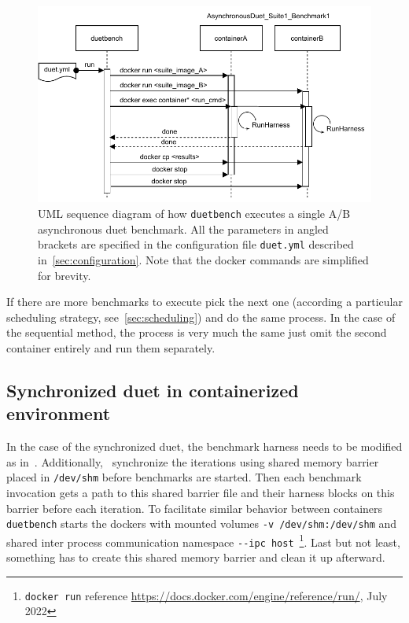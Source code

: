\begin{figure}
	\centering
	\includegraphics[width=\linewidth]{./figures/duetbench-sequence.drawio.pdf}
	\caption{
        UML sequence diagram of how \lstinline{duetbench} executes a single A/B asynchronous duet benchmark.
        All the parameters in angled brackets are specified in the configuration file \lstinline{duet.yml} described in~\cref{sec:configuration}.
        Note that the docker commands are simplified for brevity.
	}
	\label{fig:duetbench_sequence}
\end{figure}

If there are more benchmarks to execute pick the next one (according a particular scheduling strategy, see~\cref{sec:scheduling}) and do the same process.
In the case of the sequential method, the process is very much the same just omit the second container entirely and run them separately.

\subsection{Synchronized duet in containerized environment}

In the case of the synchronized duet, the benchmark harness needs to be modified as in~\citet{bulej2020duet}.
Additionally,~\citet{bulej2020duet} synchronize the iterations using shared memory barrier placed in \lstinline{/dev/shm} before benchmarks are started.
Then each benchmark invocation gets a path to this shared barrier file and their harness blocks on this barrier before each iteration.
To facilitate similar behavior between containers \lstinline{duetbench} starts the dockers with mounted volumes \lstinline{-v /dev/shm:/dev/shm} and shared inter process communication namespace \lstinline{--ipc host}~\footnote{\lstinline{docker run} reference \url{https://docs.docker.com/engine/reference/run/}, July 2022}.
Last but not least, something has to create this shared memory barrier and clean it up afterward.

